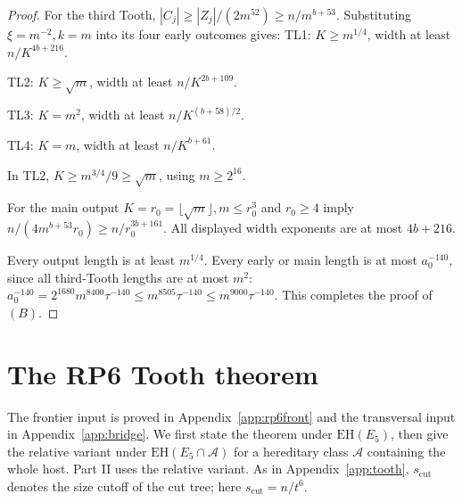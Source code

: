 \documentclass[11pt,a4paper]{article}
\theoremstyle{definition}
\theoremstyle{remark}
\numberwithin{equation}{section}
\newcommand{\EH}{\mathrm{EH}}
\begin{document}
\begin{proof}
For the third Tooth, \(|C_{j}|\ge\allowbreak |Z_{j}|/(2m^{52})\ge\allowbreak n/m^{b+53}\). Substituting \(\xi=m^{-2},\allowbreak k=m\) into its four early outcomes gives:
\noindent TL1: \(K\ge\allowbreak m^{1/4}\), width at least \(n/K^{4b+216}\).\par
\noindent TL2: \(K\ge\allowbreak \sqrt{m}\), width at least \(n/K^{2b+109}\).\par
\noindent TL3: \(K=m^{2}\), width at least \(n/K^{(b+58)/2}\).\par
\noindent TL4: \(K=m\), width at least \(n/K^{b+61}\).\par
In TL2, \(K\ge\allowbreak m^{3/4}/9\ge\allowbreak \sqrt{m}\), using \(m\ge\allowbreak 2^{16}\).

For the main output \(K=r_{0}=\lfloor \sqrt{m}\rfloor,\allowbreak  m\le\allowbreak r_{0}^{3}\) and \(r_{0}\ge\allowbreak 4\) imply \(n/(4m^{b+53} r_{0}) \ge\allowbreak  n/r_{0}^{3b+161}\). All displayed width exponents are at most \(4b+216\).

Every output length is at least \(m^{1/4}\). Every early or main length is at most \(a_{0}^{-140}\), since all third-Tooth lengths are at most \(m^{2}\): \(a_{0}^{-140} = 2^{1680} m^{8400} \tau^{-140} \le\allowbreak  m^{8505} \tau^{-140} \le\allowbreak  m^{9000} \tau^{-140}\). This completes the proof of \((B)\).
\end{proof}

\section{The RP6 Tooth theorem}\label{app:rp6}

The frontier input is proved in Appendix~\ref{app:rp6front} and the transversal input in Appendix~\ref{app:bridge}. We first state the theorem under \(\EH(E_5)\), then give the relative variant under \(\EH(E_5\cap\mathcal A)\) for a hereditary class \(\mathcal A\) containing the whole host. Part II uses the relative variant. As in Appendix~\ref{app:tooth}, \(s_{\mathrm{cut}}\) denotes the size cutoff of the cut tree; here \(s_{\mathrm{cut}}=n/t^6\).
\end{document}

